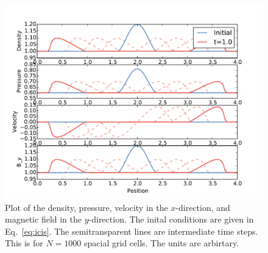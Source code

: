 \documentclass[iop,twocolumn]{emulateapj}
\begin{document}
\begin{figure}[htb!]
\includegraphics[scale=.9,trim=0cm 0cm 0cm 0cm,clip]{f2.pdf}
\caption{Plot of the density, pressure, velocity in the $x$-direction, and magnetic field in the $y$-direction. The inital conditions are given in Eq.~\ref{eq:icis}. The semitransparent lines are intermediate time steps. This is for $N=1000$ spacial grid cells. The units are arbirtary. \label{fig:f2}}
\end{figure}


\end{document}
